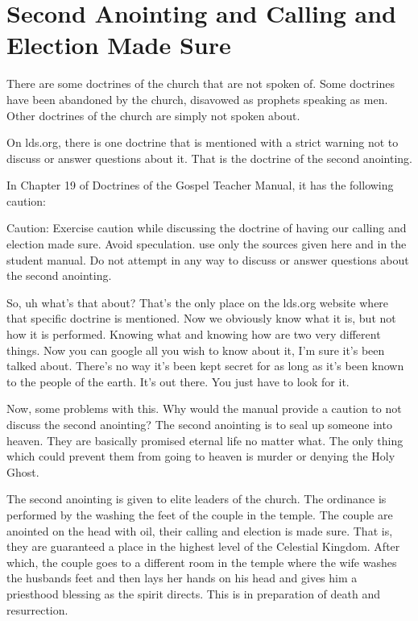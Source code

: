 \section{Second Anointing and Calling and Election Made Sure}

There are some doctrines of the church that are not spoken of. Some doctrines 
have been abandoned by the church, disavowed as prophets speaking as men. 
Other doctrines of the church are simply not spoken about.

On lds.org, there is one doctrine that is mentioned with a strict warning not to 
discuss or answer questions about it. That is the doctrine of the second 
anointing.

In Chapter 19 of Doctrines of the Gospel Teacher Manual, it has the following 
caution:

\begin{displayquote}
Caution: Exercise caution while discussing the doctrine of having our calling 
and election made sure. Avoid speculation. use only the sources given here and 
in the student manual. Do not attempt in any way to discuss or answer questions 
about the second anointing.
\end{displayquote}

So, uh what’s that about? That’s the only place on the lds.org website where 
that specific doctrine is mentioned. Now we obviously know what it is, but not 
how it is performed. Knowing what and knowing how are two very different things. 
Now you can google all you wish to know about it, I’m sure it’s been talked 
about. There’s no way it’s been kept secret for as long as it’s been known to 
the people of the earth. It’s out there. You just have to look for it.

 Now, some problems with this. Why would the manual provide a caution to not 
 discuss the second anointing? The second anointing is to seal up someone into 
 heaven. They are basically promised eternal life no matter what. The only thing 
 which could prevent them from going to heaven is murder or denying the Holy 
 Ghost.
 
 The second anointing is given to elite leaders of the church. The ordinance is 
 performed by the washing the feet of the couple in the temple. The couple are 
 anointed on the head with oil, their calling and election is made sure. That 
 is, they are guaranteed a place in the highest level of the Celestial Kingdom. 
 After which, the couple goes to a different room in the temple where the wife 
 washes the husbands feet and then lays her hands on his head and gives him a 
 priesthood blessing as the spirit directs. This is in preparation of death and 
 resurrection.
 
